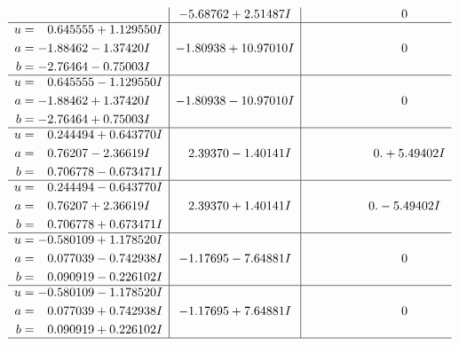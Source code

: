 \documentclass[1p]{elsarticle_modified}
\theoremstyle{definition}
\begin{document}
$$\begin{array}{c|c|c}
 & -5.68762 + 2.51487 I & \phantom{-0.000000 } 0 \\ \hline\begin{aligned}
u &= \phantom{-}0.645555 + 1.129550 I \\
a &= -1.88462 - 1.37420 I \\
b &= -2.76464 - 0.75003 I\end{aligned}
 & -1.80938 + 10.97010 I & \phantom{-0.000000 } 0 \\ \hline\begin{aligned}
u &= \phantom{-}0.645555 - 1.129550 I \\
a &= -1.88462 + 1.37420 I \\
b &= -2.76464 + 0.75003 I\end{aligned}
 & -1.80938 - 10.97010 I & \phantom{-0.000000 } 0 \\ \hline\begin{aligned}
u &= \phantom{-}0.244494 + 0.643770 I \\
a &= \phantom{-}0.76207 - 2.36619 I \\
b &= \phantom{-}0.706778 - 0.673471 I\end{aligned}
 & \phantom{-}2.39370 - 1.40141 I & \phantom{-0.000000 -}0. + 5.49402 I \\ \hline\begin{aligned}
u &= \phantom{-}0.244494 - 0.643770 I \\
a &= \phantom{-}0.76207 + 2.36619 I \\
b &= \phantom{-}0.706778 + 0.673471 I\end{aligned}
 & \phantom{-}2.39370 + 1.40141 I & \phantom{-0.000000 } 0. - 5.49402 I \\ \hline\begin{aligned}
u &= -0.580109 + 1.178520 I \\
a &= \phantom{-}0.077039 - 0.742938 I \\
b &= \phantom{-}0.090919 - 0.226102 I\end{aligned}
 & -1.17695 - 7.64881 I & \phantom{-0.000000 } 0 \\ \hline\begin{aligned}
u &= -0.580109 - 1.178520 I \\
a &= \phantom{-}0.077039 + 0.742938 I \\
b &= \phantom{-}0.090919 + 0.226102 I\end{aligned}
 & -1.17695 + 7.64881 I & \phantom{-0.000000 } 0\\
 \hline 
 \end{array}$$\newpage$$\begin{array}{c|c|c}  

\end{array}$$
\end{document}
